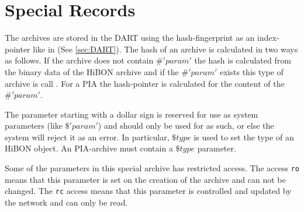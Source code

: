\section{Special Records}

The archives are stored in the DART using the hash-fingerprint as an index-pointer like in  (See \cref{sec:DART}). The hash of an archive is calculated in two ways as follows. If the archive does not contain $\#'param'$ the hash is calculated from the binary data of the HiBON archive and if the $\#'param'$ exists this type of archive is call . For a PIA the hash-pointer is calculated for the content of the $\#'param'$.

The parameter starting with a dollar sign is reserved for use as system parameters (like $\$'param'$) and should only be used for as such, or else the system will reject it as an error.
In particular, $\$type$ is used to set the type of an HiBON object.
An PIA-archive must contain a $\$type$ parameter.

Some of the parameters in this special archive has restricted access.
The access \texttt{ro} means that this parameter is set on the creation of the archive and can not be changed. The \texttt{rc} access means that this parameter is controlled and updated by the network and can only be read. 







